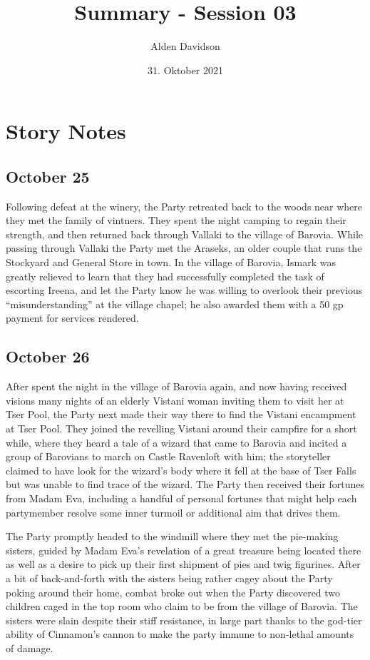 \documentclass[a4paper,11pt]{article}
\title{Summary - Session 03}
\author{Alden Davidson}
\date{31. Oktober 2021}
\begin{document}
\maketitle

\section{Story Notes}
\subsection{October 25}
Following defeat at the winery, the Party retreated back to the woods near where they met the family of vintners.
They spent the night camping to regain their strength, and then returned back through Vallaki to the village of 
Barovia. While passing through Vallaki the Party met the Araseks, an older couple that runs the Stockyard and 
General Store in town. In the village of Barovia, Ismark was greatly relieved to learn that they had successfully 
completed the task of escorting Ireena, and let the Party know he was willing to overlook their previous 
``misunderstanding'' at the village chapel; he also awarded them with a 50 gp payment for services rendered.

\subsection{October 26}
After spent the night in the village of Barovia again, and now having received visions many nights of an elderly 
Vistani woman inviting them to visit her at Tser Pool, the Party next made their way there to find the Vistani 
encampment at Tser Pool. They joined the revelling Vistani around their campfire for a short while, where they 
heard a tale of a wizard that came to Barovia and incited a group of Barovians to march on Castle Ravenloft with 
him; the storyteller claimed to have look for the wizard's body where it fell at the base of Tser Falls but was 
unable to find trace of the wizard. The Party then received their fortunes from Madam Eva, including a handful of 
personal fortunes that might help each partymember resolve some inner turmoil or additional aim that drives them.

The Party promptly headed to the windmill where they met the pie-making sisters, guided by Madam Eva's revelation 
of a great treasure being located there as well as a desire to pick up their first shipment of pies and twig 
figurines. After a bit of back-and-forth with the sisters being rather cagey about the Party poking around their 
home, combat broke out when the Party discovered two children caged in the top room who claim to be from the 
village of Barovia. The sisters were slain despite their stiff resistance, in large part thanks to the god-tier 
ability of Cinnamon's cannon to make the party immune to non-lethal amounts of damage.
\end{document}
